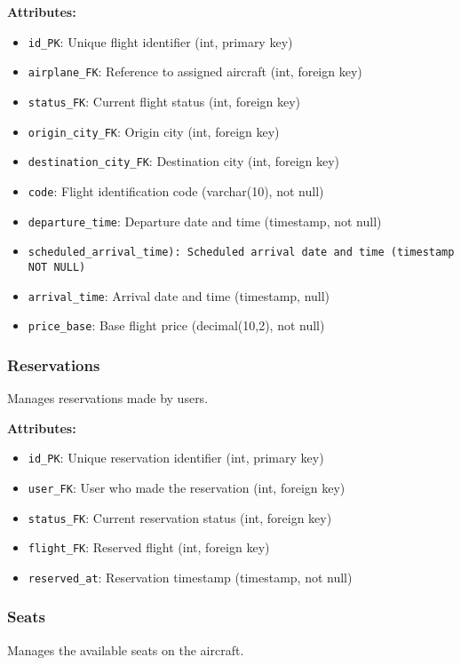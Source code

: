 \documentclass[conference]{IEEEtran}
\begin{document}
    \textbf{Attributes:}
    \begin{itemize}
        \item \texttt{id\_PK}: Unique flight identifier (int, primary key)
        \item \texttt{airplane\_FK}: Reference to assigned aircraft (int, foreign key)
        \item \texttt{status\_FK}: Current flight status (int, foreign key)
        \item \texttt{origin\_city\_FK}: Origin city (int, foreign key)
        \item \texttt{destination\_city\_FK}: Destination city (int, foreign key)
        \item \texttt{code}: Flight identification code (varchar(10), not null)
        \item \texttt{departure\_time}: Departure date and time (timestamp, not null)
        \item \texttt{scheduled\_arrival\_time): Scheduled arrival date and time (timestamp NOT NULL)}
        \item \texttt{arrival\_time}: Arrival date and time (timestamp, null)
        \item \texttt{price\_base}: Base flight price (decimal(10,2), not null)
    \end{itemize}

    \subsubsection{Reservations}
    Manages reservations made by users.

    \textbf{Attributes:}
    \begin{itemize}
        \item \texttt{id\_PK}: Unique reservation identifier (int, primary key)
        \item \texttt{user\_FK}: User who made the reservation (int, foreign key)
        \item \texttt{status\_FK}: Current reservation status (int, foreign key)
        \item \texttt{flight\_FK}: Reserved flight (int, foreign key)
        \item \texttt{reserved\_at}: Reservation timestamp (timestamp, not null)
    \end{itemize}

    \subsubsection{Seats}
    Manages the available seats on the aircraft.
\end{document}
